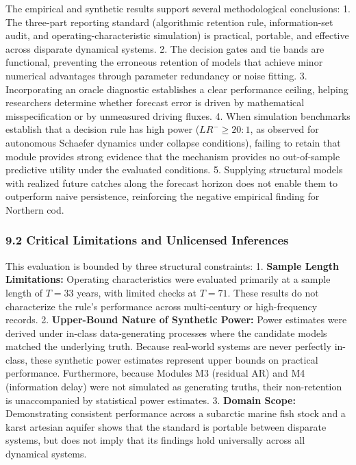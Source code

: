 \documentclass[11pt]{article}
\begin{document}
The empirical and synthetic results support several methodological
conclusions: 1. The three-part reporting standard (algorithmic retention
rule, information-set audit, and operating-characteristic simulation) is
practical, portable, and effective across disparate dynamical systems.
2. The decision gates and tie bands are functional, preventing the
erroneous retention of models that achieve minor numerical advantages
through parameter redundancy or noise fitting. 3. Incorporating an
oracle diagnostic establishes a clear performance ceiling, helping
researchers determine whether forecast error is driven by mathematical
misspecification or by unmeasured driving fluxes. 4. When simulation
benchmarks establish that a decision rule has high power
(\(LR^- \ge 20:1\), as observed for autonomous Schaefer dynamics under
collapse conditions), failing to retain that module provides strong
evidence that the mechanism provides no out-of-sample predictive utility
under the evaluated conditions. 5. Supplying structural models with
realized future catches along the forecast horizon does not enable them
to outperform naive persistence, reinforcing the negative empirical
finding for Northern cod.

\subsubsection{9.2 Critical Limitations and Unlicensed
Inferences}\label{critical-limitations-and-unlicensed-inferences}

This evaluation is bounded by three structural constraints: 1.
\textbf{Sample Length Limitations:} Operating characteristics were
evaluated primarily at a sample length of \(T = 33\) years, with limited
checks at \(T = 71\). These results do not characterize the rule's
performance across multi-century or high-frequency records. 2.
\textbf{Upper-Bound Nature of Synthetic Power:} Power estimates were
derived under in-class data-generating processes where the candidate
models matched the underlying truth. Because real-world systems are
never perfectly in-class, these synthetic power estimates represent
upper bounds on practical performance. Furthermore, because Modules M3
(residual AR) and M4 (information delay) were not simulated as
generating truths, their non-retention is unaccompanied by statistical
power estimates. 3. \textbf{Domain Scope:} Demonstrating consistent
performance across a subarctic marine fish stock and a karst artesian
aquifer shows that the standard is portable between disparate systems,
but does not imply that its findings hold universally across all
dynamical systems.
\end{document}
